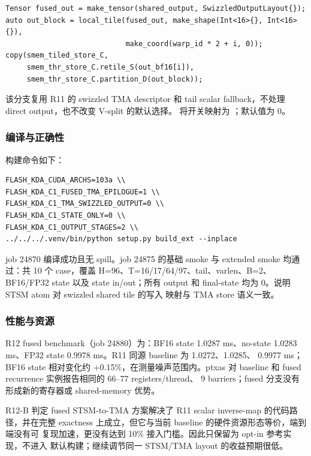 \begin{lstlisting}
Tensor fused_out = make_tensor(shared_output, SwizzledOutputLayout{});
auto out_block = local_tile(fused_out, make_shape(Int<16>{}, Int<16>{}),
                            make_coord(warp_id * 2 + i, 0));
copy(smem_tiled_store_C,
     smem_thr_store_C.retile_S(out_bf16[i]),
     smem_thr_store_C.partition_D(out_block));
\end{lstlisting}

该分支复用 R11 的 swizzled TMA descriptor 和 tail scalar fallback，不处理
direct output，也不改变 V-split 的默认选择。 将开关映射为
；默认值为 0。

\subsubsection{编译与正确性}

构建命令如下：

\begin{lstlisting}
FLASH_KDA_CUDA_ARCHS=103a \\
FLASH_KDA_C1_FUSED_TMA_EPILOGUE=1 \\
FLASH_KDA_C1_TMA_SWIZZLED_OUTPUT=0 \\
FLASH_KDA_C1_STATE_ONLY=0 \\
FLASH_KDA_C1_OUTPUT_STAGES=2 \\
../../../.venv/bin/python setup.py build_ext --inplace
\end{lstlisting}

job 24870 编译成功且无 spill。job 24875 的基础 smoke 与 extended smoke
均通过：共 10 个 case，覆盖 H=96、T=16/17/64/97、tail、varlen、B=2、
BF16/FP32 state 以及 state in/out；所有 output 和 final-state
 均为 0。说明 STSM atom 对 swizzled shared tile 的写入
映射与 TMA store 语义一致。

\subsubsection{性能与资源}

R12 fused benchmark（job 24880）为：BF16 state 1.0287 ms、no-state
1.0283 ms、FP32 state 0.9978 ms。R11 同源 baseline 为 1.0272、1.0285、
0.9977 ms；BF16 state 相对变化约 +0.15\%，在测量噪声范围内。ptxas 对
baseline 和 fused recurrence 实例报告相同的 66--77 registers/thread、
9 barriers；fused 分支没有形成新的寄存器或 shared-memory 优势。

\begin{decision}{R12-B 判定}
fused STSM-to-TMA 方案解决了 R11 scalar inverse-map 的代码路径，并在完整
exactness 上成立，但它与当前 baseline 的硬件资源形态等价，端到端没有可
复现加速，更没有达到 10\% 接入门槛。因此只保留为 opt-in 参考实现，不进入
默认构建；继续调节同一 STSM/TMA layout 的收益预期很低。
\end{decision}

